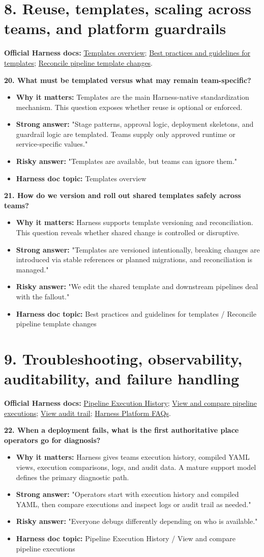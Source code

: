 \documentclass[11pt]{article}
\newcommand{\doccluster}[1]{%
  {\small\textcolor{AccentGray}{\textbf{Official Harness docs:} #1}}\par\vspace{0.4em}
}
\newcommand{\qblock}[5]{%
  \textbf{#1}\par
  \begin{itemize}[leftmargin=1.5em,itemsep=0.2em,topsep=0.3em]
    \item[--] \textbf{Why it matters:} #2
    \item[--] \textbf{Strong answer:} #3
    \item[--] \textbf{Risky answer:} #4
    \item[--] \textbf{Harness doc topic:} #5
  \end{itemize}
  \vspace{0.4em}
}
\begin{document}
\section*{8. Reuse, templates, scaling across teams, and platform guardrails}
\doccluster{\href{https://developer.harness.io/docs/platform/templates/template}{Templates overview}; \href{https://developer.harness.io/docs/platform/templates/templates-best-practices}{Best practices and guidelines for templates}; \href{https://developer.harness.io/docs/platform/templates/reconcile-pipeline-templates/}{Reconcile pipeline template changes}.}

\qblock{20. What must be templated versus what may remain team-specific?}{Templates are the main Harness-native standardization mechanism. This question exposes whether reuse is optional or enforced.}{"Stage patterns, approval logic, deployment skeletons, and guardrail logic are templated. Teams supply only approved runtime or service-specific values."}{"Templates are available, but teams can ignore them."}{Templates overview}

\qblock{21. How do we version and roll out shared templates safely across teams?}{Harness supports template versioning and reconciliation. This question reveals whether shared change is controlled or disruptive.}{"Templates are versioned intentionally, breaking changes are introduced via stable references or planned migrations, and reconciliation is managed."}{"We edit the shared template and downstream pipelines deal with the fallout."}{Best practices and guidelines for templates / Reconcile pipeline template changes}

\section*{9. Troubleshooting, observability, auditability, and failure handling}
\doccluster{\href{https://developer.harness.io/docs/continuous-delivery/x-platform-cd-features/executions/execution-history}{Pipeline Execution History}; \href{https://developer.harness.io/docs/platform/pipelines/executions-and-logs/view-and-compare-pipeline-executions}{View and compare pipeline executions}; \href{https://developer.harness.io/docs/platform/governance/audit-trail/}{View audit trail}; \href{https://developer.harness.io/docs/platform/harness-platform-faqs}{Harness Platform FAQs}.}

\qblock{22. When a deployment fails, what is the first authoritative place operators go for diagnosis?}{Harness gives teams execution history, compiled YAML views, execution comparisons, logs, and audit data. A mature support model defines the primary diagnostic path.}{"Operators start with execution history and compiled YAML, then compare executions and inspect logs or audit trail as needed."}{"Everyone debugs differently depending on who is available."}{Pipeline Execution History / View and compare pipeline executions}
\end{document}
